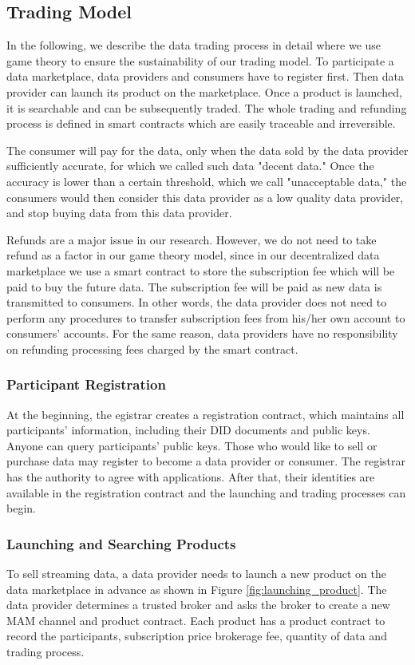 \documentclass[journal,article,applsci,submit,moreauthors,pdftex]{Definitions/mdpi}
\begin{document}
\subsection{Trading Model}
In the following, we describe the data trading process in detail where we use game theory to ensure the sustainability of our trading model. To participate a data marketplace, data providers and consumers have to register first. Then data provider can launch its product on the marketplace. Once a product is launched, it is searchable and can be subsequently traded. The whole trading and refunding process is defined in smart contracts which are easily traceable and irreversible.

The consumer will pay for the data, only when the data sold by the data provider sufficiently accurate, for which we called such data "decent data."
Once the accuracy is lower than a certain threshold, which we call "unacceptable data," the consumers would then consider this data provider as a low quality data provider, and stop buying data from this data provider.

Refunds are a major issue in our research. However, we do not need to take refund as a factor in our game theory model, since in our decentralized data marketplace we use a smart contract to store the subscription fee which will be paid to buy the future data. The subscription fee will be paid as new data is transmitted to consumers. In other words, the data provider does not need to perform any procedures to transfer subscription fees from his/her own account to consumers' accounts. For the same reason, data providers have no responsibility on refunding processing fees charged by the smart contract.

\subsubsection{Participant Registration}
At the beginning, the egistrar creates a registration contract, which maintains all participants' information, including their DID documents and public keys. Anyone can query participants' public keys. Those who would like to sell or purchase data may register to become a data provider or consumer. The registrar has the authority to agree with applications. After that, their identities are available in the registration contract and the launching and trading processes can begin.

\subsubsection{Launching and Searching Products}
To sell streaming data, a data provider needs to launch a new product on the data marketplace in advance as shown in Figure \ref{fig:launching_product}. The data provider determines a trusted broker and asks the broker to create a new MAM channel and product contract. Each product has a product contract to record the participants, subscription price brokerage fee, quantity of data and  trading process.
\end{document}
